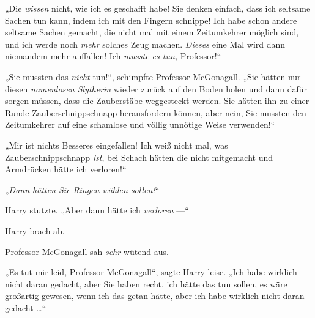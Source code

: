 „Die \emph{wissen} nicht, wie ich es geschafft habe! Sie denken einfach, dass ich seltsame Sachen tun kann, indem ich mit den Fingern schnippe! Ich habe schon andere seltsame Sachen gemacht, die nicht mal mit einem Zeitumkehrer möglich sind, und ich werde noch \emph{mehr} solches Zeug machen. \emph{Dieses} eine Mal wird dann niemandem mehr auffallen! Ich \emph{musste es tun,} Professor!“

„Sie mussten das \emph{nicht} tun!“, schimpfte Professor McGonagall.
„Sie hätten nur diesen \emph{namenlosen Slytherin} wieder zurück auf den Boden holen und dann dafür sorgen müssen, dass die Zauberstäbe weggesteckt werden. Sie hätten ihn zu einer Runde Zauberschnippschnapp herausfordern können, aber nein, Sie mussten den Zeitumkehrer auf eine schamlose und völlig unnötige Weise verwenden!“%

„Mir ist nichts Besseres eingefallen! Ich weiß nicht mal, was Zauberschnippschnapp \emph{ist}, bei Schach hätten die nicht mitgemacht und Armdrücken hätte ich verloren!“

„\emph{Dann hätten Sie Ringen wählen sollen!}“

Harry stutzte.
„Aber dann hätte ich \emph{verloren} —“

Harry brach ab.

Professor McGonagall sah \emph{sehr} wütend aus.

„Es tut mir leid, Professor McGonagall“, sagte Harry leise.
„Ich habe wirklich nicht daran gedacht, aber Sie haben recht, ich hätte das tun sollen, es wäre großartig gewesen, wenn ich das getan hätte, aber ich habe wirklich nicht daran gedacht …“

